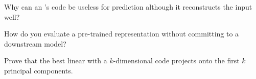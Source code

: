 \begin{interviewq}\label{iq:ml:representation-learning:4}
Why can an 's code be useless for prediction although it reconstructs the input well?
\end{interviewq}

\begin{interviewq}\label{iq:ml:representation-learning:5}
How do you evaluate a pre-trained representation without committing to a downstream model?
\end{interviewq}

\begin{interviewq}\label{iq:ml:representation-learning:6}
Prove that the best linear  with a $k$-dimensional code projects onto the first $k$ principal components.
\end{interviewq}
